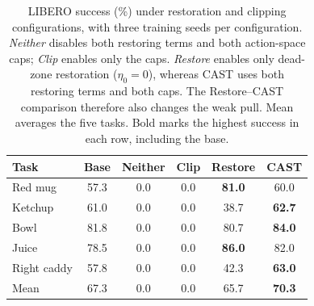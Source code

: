 \begin{table}[t]
\centering
\caption{LIBERO success (\%) under restoration and clipping
configurations, with three training seeds per configuration. \emph{Neither} disables both restoring terms and both action-space caps;
\emph{Clip} enables only the caps. \emph{Restore} enables only dead-zone restoration
($\eta_0=0$), whereas CAST uses both restoring terms and both caps.
The Restore--CAST comparison therefore also changes the weak pull. Mean averages the
five tasks. Bold marks the highest success in each row, including the base.}
\label{tab:ablations}
\footnotesize
\setlength{\tabcolsep}{3pt}
\begin{tabular}{@{}lccccc@{}}
\toprule
Task & Base & Neither & Clip & Restore & CAST \\
\midrule
Red mug & 57.3 & 0.0 & 0.0 & \textbf{81.0} & 60.0 \\
Ketchup & 61.0 & 0.0 & 0.0 & 38.7 & \textbf{62.7} \\
Bowl & 81.8 & 0.0 & 0.0 & 80.7 & \textbf{84.0} \\
Juice & 78.5 & 0.0 & 0.0 & \textbf{86.0} & 82.0 \\
Right caddy & 57.8 & 0.0 & 0.0 & 42.3 & \textbf{63.0} \\
\midrule
Mean & 67.3 & 0.0 & 0.0 & 65.7 & \textbf{70.3} \\
\bottomrule
\end{tabular}
\end{table}
